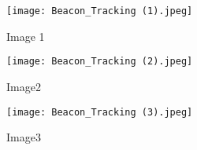\documentclass[journal,12pt,twocolumn]{IEEEtran}
\begin{document}
\begin{figure}[!ht]
\centering
\texttt{[image: Beacon\_Tracking (1).jpeg]}
\caption{Image 1}
\end{figure}

\begin{figure}[!ht]
\centering
\texttt{[image: Beacon\_Tracking (2).jpeg]}
\caption{Image2}
\end{figure}

\begin{figure}[!ht]
\centering
\texttt{[image: Beacon\_Tracking (3).jpeg]}
\caption{Image3}
\end{figure}
\end{document}
